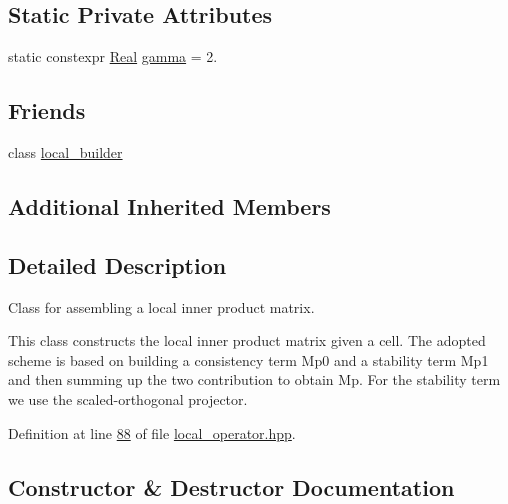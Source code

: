\subsection*{Static Private Attributes}
\begin{DoxyCompactItemize}
\item 
static constexpr \hyperlink{namespaceFVCode3D_a40c1f5588a248569d80aa5f867080e83}{Real} \hyperlink{classFVCode3D_1_1local__InnerProduct_af7c3e141a73231635abf5fdb7fe65fae}{gamma} = 2.
\end{DoxyCompactItemize}
\subsection*{Friends}
\begin{DoxyCompactItemize}
\item 
class \hyperlink{classFVCode3D_1_1local__InnerProduct_abcd35ed5f4c4c65e5aee0132d25150ff}{local\+\_\+builder}
\end{DoxyCompactItemize}
\subsection*{Additional Inherited Members}


\subsection{Detailed Description}
Class for assembling a local inner product matrix. 

This class constructs the local inner product matrix given a cell. The adopted scheme is based on building a consistency term Mp0 and a stability term Mp1 and then summing up the two contribution to obtain Mp. For the stability term we use the scaled-\/orthogonal projector. 

Definition at line \hyperlink{local__operator_8hpp_source_l00088}{88} of file \hyperlink{local__operator_8hpp_source}{local\+\_\+operator.\+hpp}.



\subsection{Constructor \& Destructor Documentation}
